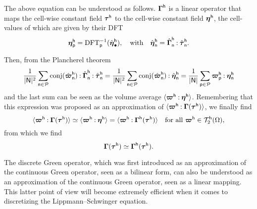 The above equation can be understood as follows. \(\boldsymbol\Gamma^{\mathsf h}\) is a
linear operator that maps the cell-wise constant field \(\boldsymbol\tau^{\mathsf h}\)
to the cell-wise constant field \(\boldsymbol\eta^{\mathsf h}\), the cell-values of
which are given by their DFT
\begin{equation}
  \boldsymbol{\eta}_{\mathsf p}^{\mathsf h}=
  \operatorname{DFT}^{-1}_{\mathsf p}(\hat{\boldsymbol\eta}_{\bullet}^{\mathsf h}),\quad\text{with}
  \quad\hat{\boldsymbol\eta}_{\mathsf n}^{\mathsf h}
  =\hat{\boldsymbol\Gamma}_{\mathsf n}^{\mathsf h}\mathbin{\mathord{:}}
  \hat{\boldsymbol\tau}_{\mathsf n}^{\mathsf h}.
\end{equation}

Then, from the Plancherel theorem
\begin{equation}
  \frac1{\lvert\mathsf N\rvert^2}
  \sum_{\mathsf n\in\mathcal{P}}\operatorname{conj}(\hat{\boldsymbol\varpi}_{\mathsf n}^{\mathsf h})
  \mathbin{\mathord{:}}\hat{\boldsymbol\Gamma}_{\mathsf n}^{\mathsf h}\mathbin{\mathord{:}}
  \hat{\boldsymbol\tau}_{\mathsf n}^{\mathsf h}=\frac1{\lvert\mathsf N\rvert^2}
  \sum_{\mathsf n\in\mathcal{P}}\operatorname{conj}(\hat{\boldsymbol\varpi}_{\mathsf n}^{\mathsf h})
  \mathbin{\mathord{:}}\hat{\boldsymbol\eta}_{\mathsf n}^{\mathsf h}=\frac1{\lvert\mathsf N\rvert}
  \sum_{\mathsf p\in\mathcal{P}}\boldsymbol\varpi_{\mathsf p}^{\mathsf h}
  \mathbin{\mathord{:}}\boldsymbol\eta_{\mathsf n}^{\mathsf h}
\end{equation}
and the last sum can be seen as the volume average
\(\langle\boldsymbol\varpi^{\mathsf h}\mathbin{\mathord{:}}\boldsymbol\eta^{\mathsf h}\rangle\). Remembering
that this expression was proposed as an approximation of
\(\langle\boldsymbol\varpi^{\mathsf h}\mathbin{\mathord{:}}\boldsymbol\Gamma(\boldsymbol\tau^{\mathsf
  h})\rangle\), we finally find
\begin{equation}
  \langle\boldsymbol\varpi^{\mathsf h}\mathbin{\mathord{:}}\boldsymbol\Gamma(\boldsymbol\tau^{\mathsf h})\rangle
  \simeq\langle\boldsymbol\varpi^{\mathsf h}\mathbin{\mathord{:}}\boldsymbol\eta^{\mathsf h}\rangle
  =\langle\boldsymbol\varpi^{\mathsf h}\mathbin{\mathord{:}}\boldsymbol\Gamma^{\mathsf h}(\boldsymbol\tau^{\mathsf h})\rangle
  \quad\text{for all }\boldsymbol\varpi^{\mathsf h}\in\mathcal T_2^{\mathsf h}(\Omega),
\end{equation}
from which we find
\begin{equation}
  \boldsymbol\Gamma(\boldsymbol\tau^{\mathsf h})\simeq\boldsymbol\Gamma^{\mathsf h}
  (\boldsymbol\tau^{\mathsf h}).
\end{equation}

The discrete Green operator, which was first introduced as an approximation of
the continuous Green operator, seen as a bilinear form, can also be understood
as an approximation of the continuous Green operator, seen as a linear
mapping. This latter point of view will become extremely efficient when it comes
to discretizing the Lippmann–Schwinger equation.

